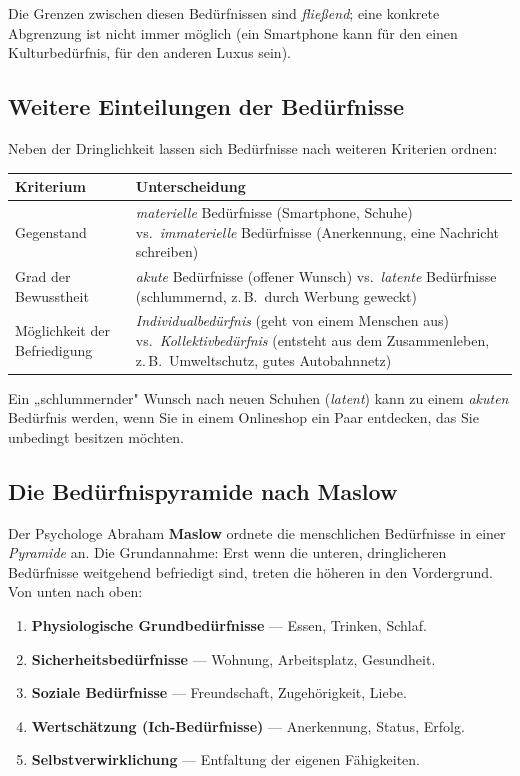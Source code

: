 \documentclass[11pt, a4paper]{article}
\begin{document}
Die Grenzen zwischen diesen Bedürfnissen sind \emph{fließend}; eine konkrete Abgrenzung
ist nicht immer möglich (ein Smartphone kann für den einen Kulturbedürfnis, für den
anderen Luxus sein).

\subsection{Weitere Einteilungen der Bedürfnisse}

Neben der Dringlichkeit lassen sich Bedürfnisse nach weiteren Kriterien ordnen:

\begin{center}
\begin{tabular}{p{4.5cm} p{9cm}}
\toprule
\textbf{Kriterium} & \textbf{Unterscheidung}\\
\midrule
Gegenstand & \emph{materielle} Bedürfnisse (Smartphone, Schuhe) vs.\ \emph{immaterielle} Bedürfnisse (Anerkennung, eine Nachricht schreiben)\\
Grad der Bewusstheit & \emph{akute} Bedürfnisse (offener Wunsch) vs.\ \emph{latente} Bedürfnisse (schlummernd, z.\,B.\ durch Werbung geweckt)\\
Möglichkeit der Befriedigung & \emph{Individualbedürfnis} (geht von einem Menschen aus) vs.\ \emph{Kollektivbedürfnis} (entsteht aus dem Zusammenleben, z.\,B.\ Umweltschutz, gutes Autobahnnetz)\\
\bottomrule
\end{tabular}
\end{center}

\begin{beispiel}
Ein „schlummernder" Wunsch nach neuen Schuhen (\emph{latent}) kann zu einem \emph{akuten}
Bedürfnis werden, wenn Sie in einem Onlineshop ein Paar entdecken, das Sie unbedingt
besitzen möchten.
\end{beispiel}

\subsection{Die Bedürfnispyramide nach Maslow}

Der Psychologe Abraham \textbf{Maslow} ordnete die menschlichen Bedürfnisse in einer
\emph{Pyramide} an. Die Grundannahme: Erst wenn die unteren, dringlicheren Bedürfnisse
weitgehend befriedigt sind, treten die höheren in den Vordergrund. Von unten nach oben:

\begin{enumerate}
  \item \textbf{Physiologische Grundbedürfnisse} --- Essen, Trinken, Schlaf.
  \item \textbf{Sicherheitsbedürfnisse} --- Wohnung, Arbeitsplatz, Gesundheit.
  \item \textbf{Soziale Bedürfnisse} --- Freundschaft, Zugehörigkeit, Liebe.
  \item \textbf{Wertschätzung (Ich-Bedürfnisse)} --- Anerkennung, Status, Erfolg.
  \item \textbf{Selbstverwirklichung} --- Entfaltung der eigenen Fähigkeiten.
\end{enumerate}
\end{document}
